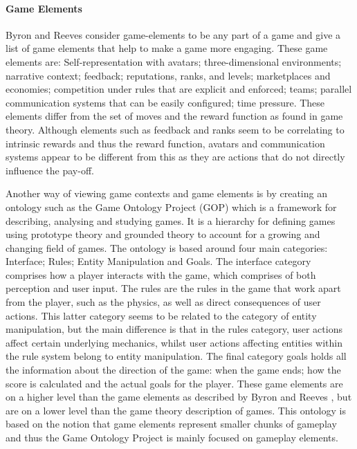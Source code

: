 \documentclass[11pt]{article}
\begin{document}
\paragraph{Game Elements}
Byron and Reeves \cite{Byron2009} consider game-elements to be any part of a game and give a list of game elements that help to make a game more engaging. These game elements are: Self-representation with avatars; three-dimensional environments; narrative context; feedback; reputations, ranks, and levels; marketplaces and economies; competition under rules that are explicit and enforced; teams; parallel communication systems that can be easily configured; time pressure. These elements differ from the set of moves and the reward function as found in game theory. Although elements such as feedback and ranks seem to be correlating to intrinsic rewards and thus the reward function, avatars and communication systems appear to be different from this as they are actions that do not directly influence the pay-off.

Another way of viewing game contexts and game elements is by creating an ontology such as the Game Ontology Project (GOP) \cite{Zagal2008} which is a framework for describing, analysing and studying games. It is a hierarchy for defining games using prototype theory and grounded theory to account for a growing and changing field of games. The ontology is based around four main categories: Interface; Rules; Entity Manipulation and Goals. The interface category comprises how a player interacts with the game, which comprises of both perception and user input. The rules are the rules in the game that work apart from the player, such as the physics, as well as direct consequences of user actions. This latter category seems to be related to the category of entity manipulation, but the main difference is that in the rules category, user actions affect certain underlying mechanics, whilst user actions affecting entities within the rule system belong to entity manipulation. The final category goals holds all the 
information about the direction of the game: when the game ends; how the score is calculated and the actual goals for the player.
These game elements are on a higher level than the game elements as described by Byron and Reeves \cite{Byron2009}, but are on a lower level than the game theory description of games. This ontology is based on the notion that game elements represent smaller chunks of gameplay \cite{Zagal2009} and thus the Game Ontology Project is mainly focused on gameplay elements.
\end{document}
